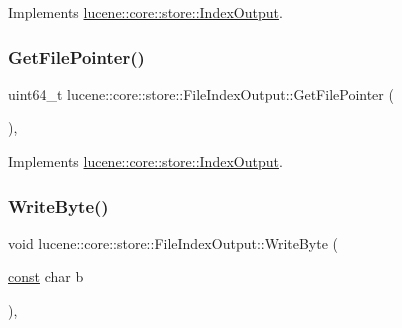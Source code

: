 Implements \mbox{\hyperlink{classlucene_1_1core_1_1store_1_1IndexOutput_aed96af5e2bc906a72b428aa132e5b2a5}{lucene\+::core\+::store\+::\+Index\+Output}}.

\mbox{\label{classlucene_1_1core_1_1store_1_1FileIndexOutput_a90285cfaf578ecc82e20f1717b76b320}} 
\subsubsection{\texorpdfstring{Get\+File\+Pointer()}{GetFilePointer()}}
{\footnotesize\ttfamily uint64\+\_\+t lucene\+::core\+::store\+::\+File\+Index\+Output\+::\+Get\+File\+Pointer (\begin{DoxyParamCaption}{ }\end{DoxyParamCaption})\hspace{0.3cm}{\ttfamily [inline]}, {\ttfamily [virtual]}}



Implements \mbox{\hyperlink{classlucene_1_1core_1_1store_1_1IndexOutput_a79bc74422633022d9ed6d088ad6d4ea2}{lucene\+::core\+::store\+::\+Index\+Output}}.

\mbox{\label{classlucene_1_1core_1_1store_1_1FileIndexOutput_a7fc2cf6d26931a835104c772b59ffde8}} 
\subsubsection{\texorpdfstring{Write\+Byte()}{WriteByte()}}
{\footnotesize\ttfamily void lucene\+::core\+::store\+::\+File\+Index\+Output\+::\+Write\+Byte (\begin{DoxyParamCaption}\item[{\mbox{\hyperlink{ZlibCrc32_8h_a2c212835823e3c54a8ab6d95c652660e}{const}} char}]{b }\end{DoxyParamCaption})\hspace{0.3cm}{\ttfamily [inline]}, {\ttfamily [virtual]}}



